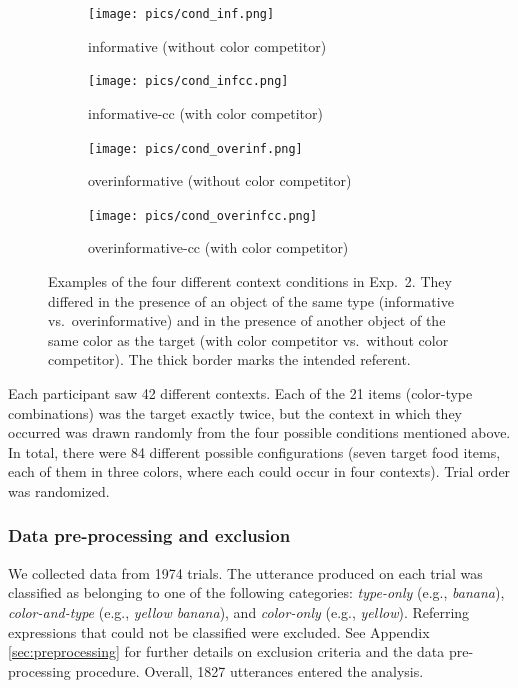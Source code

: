 \documentclass[11pt]{article}
\newcommand{\appref}[1]{Appendix \ref{#1}}
\begin{document}
\begin{figure}[bt!]
	\begin{subfigure}{.5\textwidth}
		\centering
		\texttt{[image: pics/cond\_inf.png]}
		\caption{informative (without color competitor)}
		\label{fig:condInf}
	\end{subfigure}
	\begin{subfigure}{.5\textwidth}
		\centering
		\texttt{[image: pics/cond\_infcc.png]}
		\centering
		\caption{informative-cc (with color competitor)}
		\label{fig:condInfcc}
	\end{subfigure}
	\begin{subfigure}{.5\textwidth}
		\centering
		\texttt{[image: pics/cond\_overinf.png]}
		\caption{overinformative (without color competitor)}
		\label{fig:condOverinf}
	\end{subfigure}
	\begin{subfigure}{.5\textwidth}
		\centering
		\texttt{[image: pics/cond\_overinfcc.png]}
		\centering
		\caption{overinformative-cc (with color competitor)}
		\label{fig:condOverinfcc}
	\end{subfigure}
	\caption{Examples of the four different context conditions in Exp.~2. They differed in the presence of an object of the same type (informative vs.~overinformative) and in the presence of another object of the same color as the target (with color competitor vs.~without color competitor). The thick border marks the intended referent.}
	\label{fig:conditions}
\end{figure}

Each participant saw 42 different contexts. Each of the 21 items (color-type combinations) was the target exactly twice, but the context in which they occurred was drawn randomly from the four possible conditions mentioned above. In total, there were 84 different possible configurations (seven target food items, each of them in three colors, where each could occur in four contexts). Trial order was randomized.


\subsubsection{Data pre-processing and exclusion}

We collected data from 1974 trials. The utterance produced on each trial was classified as belonging to one of the following categories: \textit{type-only} (e.g., \emph{banana}), \textit{color-and-type} (e.g., \emph{yellow banana}), and \textit{color-only} (e.g., \emph{yellow}). Referring expressions that could not be classified were excluded. See \appref{sec:preprocessing} for further details on exclusion criteria and the data pre-processing procedure. Overall, 1827 utterances entered the analysis.
\end{document}
